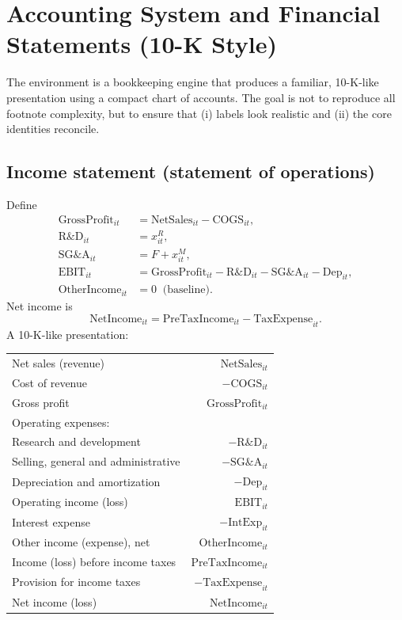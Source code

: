 \documentclass[11pt]{article}
\begin{document}
\section{Accounting System and Financial Statements (10-K Style)}

The environment is a bookkeeping engine that produces a familiar, 10-K-like presentation using a compact chart of accounts.
The goal is not to reproduce all footnote complexity, but to ensure that (i) labels look realistic and (ii) the core identities reconcile.

\subsection{Income statement (statement of operations)}
Define
\begin{align}
\text{GrossProfit}_{it}&=\text{NetSales}_{it}-\text{COGS}_{it},\\
\text{R\&D}_{it}&=x^R_{it},\\
\text{SG\&A}_{it}&=F+x^M_{it},\\
\text{EBIT}_{it}&=\text{GrossProfit}_{it}-\text{R\&D}_{it}-\text{SG\&A}_{it}-\text{Dep}_{it},\\
\text{OtherIncome}_{it}&=0\ \text{ (baseline)}.
\end{align}
Net income is
\begin{equation}
\text{NetIncome}_{it}=\text{PreTaxIncome}_{it}-\text{TaxExpense}_{it}.
\end{equation}
A 10-K-like presentation:
\begin{center}
\begin{tabular}{l r}
\toprule
Net sales (revenue) & $\text{NetSales}_{it}$\\
Cost of revenue & $-\text{COGS}_{it}$\\
\midrule
Gross profit & $\text{GrossProfit}_{it}$\\
Operating expenses: & \\
\quad Research and development & $-\text{R\&D}_{it}$\\
\quad Selling, general and administrative & $-\text{SG\&A}_{it}$\\
\quad Depreciation and amortization & $-\text{Dep}_{it}$\\
\midrule
Operating income (loss) & $\text{EBIT}_{it}$\\
Interest expense & $-\text{IntExp}_{it}$\\
Other income (expense), net & $\text{OtherIncome}_{it}$\\
\midrule
Income (loss) before income taxes & $\text{PreTaxIncome}_{it}$\\
Provision for income taxes & $-\text{TaxExpense}_{it}$\\
\midrule
Net income (loss) & $\text{NetIncome}_{it}$\\
\bottomrule
\end{tabular}
\end{center}
\end{document}
